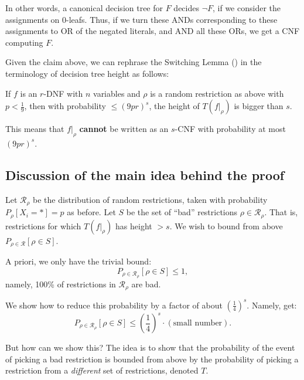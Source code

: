 In other words, a canonical decision tree for \( F \) decides \( \neg F \),
if we consider the assignments on 0-leafs.
Thus, if we turn these ANDs corresponding to these assignments to OR of the negated literals, and AND all these ORs, 
we get a CNF computing \( F \).

Given the  claim above, we can rephrase the Switching Lemma () in the terminology of decision tree height as follows: 

\begin{theorem}\label{thm:SL-DT-version}
If \( f \) is an \( r \)-DNF with \( n \) variables 
and \( \rho \) is a random restriction as above with 
\( p < \frac{1}{9} \),
then with probability \( \leq (9pr)^s \), the height of \( T(f|_{\rho}) \) 
is bigger than \( s \).
\end{theorem}

This means that \( f|_{\rho} \) \textbf{cannot} be written as an \( s \)-CNF 
with probability at most \( (9pr)^s \).

\subsection*{Discussion of the main idea behind the proof}

Let \( \mathcal{R}_{\rho} \) be the distribution of random restrictions, 
taken with probability \( P_{\rho}[X_i = *] = p \) as before.
Let \( S \) be the set of ``bad'' restrictions \( \rho \in \mathcal{R}_{\rho} \).
That is, restrictions for which \( T(f|_{\rho}) \) has height \( > s \).
We wish to bound from above \( P_{\rho\in \mathcal R}[\rho \in S] \).

A priori, we only have the trivial bound:
\[
P_{\rho \in \mathcal{R}_{\rho}}[\rho \in S] \leq 1,
\]
namely, 100\% of restrictions in \( \mathcal{R}_{\rho} \) are bad.

We show how to reduce this probability by a factor of about \( \left( \frac{1}{4} \right)^s \).
Namely, get:
\[
P_{\rho \in \mathcal{R}_{\rho}}[\rho \in S] \leq \left( \frac{1}{4} \right)^s \cdot (\text{small number}).
\]

But how can we show this?
The idea is to show that the probability of the event of picking a bad restriction 
is bounded from above by the probability of picking a restriction from a \emph{different} 
set of restrictions, denoted \( T \).

